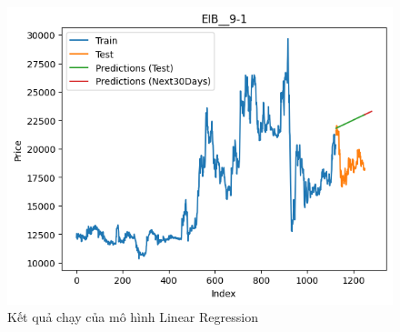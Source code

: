 \begin{figure}[H]
\begin{minipage}{0.15\textwidth}
    \includegraphics[width=1\textwidth]{resources/chapter-5/result/EIB_LinearRegression_9-1.png}
    \end{minipage}
    \hfill
    
    \caption{Kết quả chạy của mô hình Linear Regression}
    \label{fig:linear_regression_result}
\end{figure}

